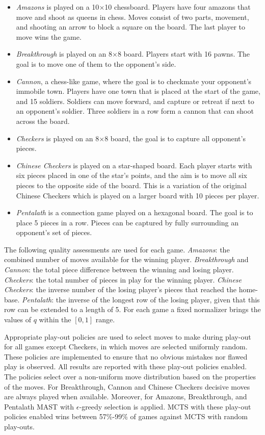\documentclass{ecai2014}
\begin{document}
\begin{itemize}
\item \emph{Amazons} is played on a 10$\times$10 chessboard. Players have four amazons that move and shoot as queens in chess. Moves consist of two parts, movement, and shooting an arrow to block a square on the board. The last player to move wins the game.
\item \emph{Breakthrough} is played on an 8$\times$8 board. Players start with 16 pawns. The goal is to move one of them to the opponent's side.
\item \emph{Cannon}, a chess-like game, where the goal is to checkmate your opponent's immobile town. Players have one town that is placed at the start of the game, and 15 soldiers. Soldiers can move  forward, and capture or retreat if next to an opponent's soldier. Three soldiers in a row form a cannon that can shoot across the board.
\item \emph{Checkers} is played on an 8$\times$8 board, the goal is to capture all opponent's pieces.
\item \emph{Chinese Checkers} is played on a star-shaped board. Each player starts with six pieces placed in one of the star's points, and the aim is to move all six pieces to the opposite side of the board. This is a variation of the original Chinese Checkers which is played on a larger board with 10 pieces per player.
\item \emph{Pentalath} is a connection game played on a hexagonal board. The goal is to place 5 pieces in a row. Pieces can be captured by fully surrounding an opponent's set of pieces.
\end{itemize}

The following quality assessments are used for each game. \emph{Amazons}: the combined number of moves available for the winning player. \emph{Breakthrough} and \emph{Cannon}: the total piece difference between the winning and losing player. \emph{Checkers}: the total number of pieces in play for the winning player. \emph{Chinese Checkers}: the inverse number of the losing player's pieces that reached the home-base. \emph{Pentalath}: the inverse of the longest row of the losing player, given that this row can be extended to a length of 5. For each game a fixed normalizer brings the values of $q$ within the $[0,1]$ range. 

Appropriate play-out policies are used to select moves to make during play-out for all games except Checkers, in which moves are selected uniformly random. These policies are implemented to ensure that no obvious mistakes nor flawed play is observed. All results are reported with these play-out policies enabled. The policies select over a non-uniform move distribution based on the properties of the moves. For Breakthrough, Cannon and Chinese Checkers decisive moves are always played when available. Moreover, for Amazons, Breakthrough, and Pentalath MAST \cite{finnsson2008simulation} with $\epsilon$-greedy selection is applied. MCTS with these play-out policies enabled wins between 57\%-99\% of games against MCTS with random play-outs. 
\end{document}
